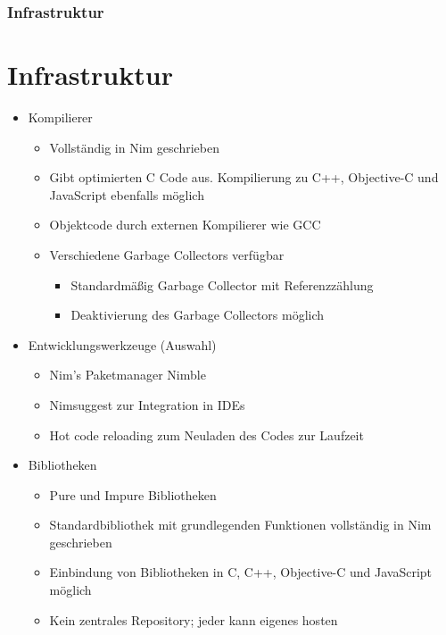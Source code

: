 \documentclass{beamer}
\begin{document}
\begin{frame}
\frametitle{Infrastruktur}
\section{Infrastruktur}
\begin{itemize}
	\item Kompilierer
	\begin{itemize}
		\item Vollständig in Nim geschrieben
		\item Gibt optimierten C Code aus. Kompilierung zu C++, Objective-C und JavaScript ebenfalls möglich
		\item Objektcode durch externen Kompilierer wie GCC
		\item Verschiedene Garbage Collectors verfügbar
		\begin{itemize}
			\item Standardmäßig Garbage Collector mit Referenzzählung
			\item Deaktivierung des Garbage Collectors möglich
		\end{itemize}
	\end{itemize}
\end{itemize}
\end{frame}


\begin{frame}
\begin{itemize}
	\item Entwicklungswerkzeuge (Auswahl)
	\begin{itemize}
		\item Nim's Paketmanager Nimble
		\item Nimsuggest zur Integration in IDEs
		\item Hot code reloading zum Neuladen des Codes zur Laufzeit
	\end{itemize}
	\item Bibliotheken
	\begin{itemize}
		\item Pure und Impure Bibliotheken
		\item Standardbibliothek mit grundlegenden Funktionen vollständig in Nim geschrieben
		\item Einbindung von Bibliotheken in C, C++, Objective-C und JavaScript möglich
		\item Kein zentrales Repository; jeder kann eigenes hosten
	\end{itemize}
\end{itemize}
\end{frame}
\end{document}
